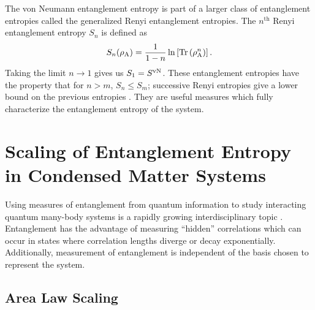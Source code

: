 The von Neumann entanglement entropy is part of a larger class of entanglement entropies called the generalized Renyi entanglement entropies.
The $n^\text{th}$ Renyi entanglement entropy $S_n$ is defined as
\begin{equation} \label{renyi}
 	S_n(\rho_{\rm A}) = \frac{1}{1-n}\ln\left[{\rm Tr}\left( \rho_{\rm A}^n \right) \right].
\end{equation}
Taking the limit $n\to1$ gives us $S_1 = S^{\text{vN}}$.  These entanglement entropies have the property that for $n>m$, $S_n\le S_m$; successive Renyi entropies give a lower bound on the previous entropies \cite{renyiproof}. They are useful measures which fully characterize the entanglement entropy of the system.

\section{Scaling of Entanglement Entropy in Condensed Matter Systems}

Using measures of entanglement from quantum information to study interacting quantum many-body systems is a rapidly growing interdisciplinary topic \cite{Amico, intro}.
Entanglement has the advantage of measuring ``hidden'' correlations which can occur in states where correlation lengths diverge or decay exponentially.
Additionally, measurement of entanglement is independent of the basis chosen to represent the system.


\subsection{Area Law Scaling}


